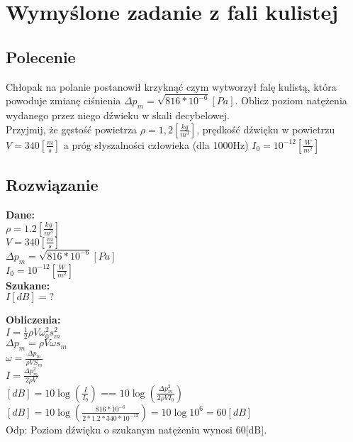 \documentclass[a4paper,14pt]{extarticle}  %
\begin{document}
    \section{Wymyślone zadanie z fali kulistej}
        \subsection{Polecenie}
        Chłopak na polanie postanowił krzyknąć czym wytworzył falę kulistą, która powoduje zmianę ciśnienia $\Delta p_m = \sqrt{816*10^{-6}}[Pa]$.
        Oblicz poziom natężenia wydanego przez niego dźwieku w skali decybelowej.\\
        Przyjmij, że gęstość powietrza $\rho = 1,2 [\frac{kg}{m^3}]$, prędkość dźwięku w powietrzu $V = 340 [\frac{m}{s}]$ a próg słyszalności człowieka (dla 1000Hz) $I_0 = 10^{-12}[\frac{W}{m^2}]$\\
        \subsection{Rozwiązanie}
        \textbf{Dane:}\\
        
     $\rho = 1.2[\frac{kg}{m^3}]$\\
     $V = 340[\frac{m}{s}]$\\
     $\Delta p_m = \sqrt{816*10^{-6}}[Pa]$\\
     $I_0 = 10^{-12}[\frac{W}{m^2}]$\\
            
        
    
   \textbf{Szukane:}\\ 
     $I[dB] = ?$
    
    
    \textbf{Obliczenia:}\\
    $I = \frac{1}{2}\rho V\omega_0^2 s_m^2 $\\
    $\Delta p_m = \rho V \omega s_m$\\
    $\omega = \frac{\Delta p_m}{\rho VS_m}$\\
    $I = \frac{\Delta p_m^2}{2\rho V}$\\
    $[dB] = 10\log(\frac{I}{I_0})$  ==  $10\log(\frac{\Delta p_m^2}{2\rho VI_0})$\\
    $[dB] = 10\log(\frac{816*10^{-6}}{2*1.2*340*10^{-12}}) = 10\log10^6 = 60[dB]$\\
    Odp: Poziom dźwięku o szukanym natężeniu wynosi 60[dB].
   
\end{document}
